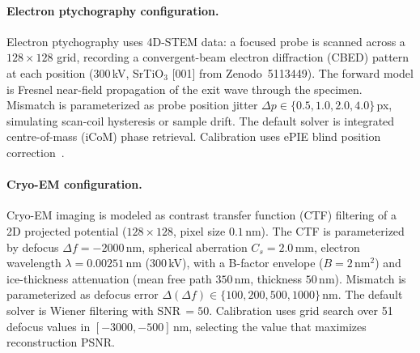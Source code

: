 \documentclass[11pt]{article}
\begin{document}
\paragraph{Electron ptychography configuration.}
Electron ptychography uses 4D-STEM data: a focused probe is scanned across
a $128 \times 128$ grid, recording a convergent-beam electron diffraction
(CBED) pattern at each position (300\,kV, SrTiO$_3$ [001] from
Zenodo~5113449).  The forward model is Fresnel near-field propagation of
the exit wave through the specimen.  Mismatch is parameterized as probe
position jitter $\Delta p \in \{0.5, 1.0, 2.0, 4.0\}$\,px, simulating
scan-coil hysteresis or sample drift.  The default solver is integrated
centre-of-mass (iCoM) phase retrieval.  Calibration uses ePIE blind
position correction~\cite{maiden2009ptychography}.

\paragraph{Cryo-EM configuration.}
\begin{sloppypar}
Cryo-EM imaging is modeled as contrast transfer function (CTF) filtering
of a 2D projected potential ($128 \times 128$, pixel size $0.1$\,nm).  The
CTF is parameterized by defocus $\Delta f = -2000$\,nm, spherical aberration
$C_s = 2.0$\,mm, electron wavelength $\lambda = 0.00251$\,nm (300\,kV),
with a B-factor envelope ($B = 2$\,nm$^2$) and ice-thickness attenuation
(mean free path $350$\,nm, thickness $50$\,nm).  Mismatch is parameterized
as defocus error $\Delta(\Delta f) \in \{100, 200, 500, 1000\}$\,nm.  The
default solver is Wiener filtering with SNR\,$= 50$.  Calibration uses grid
search over 51 defocus values in $[-3000, -500]$\,nm, selecting the value
that maximizes reconstruction PSNR.
\end{sloppypar}
\end{document}
